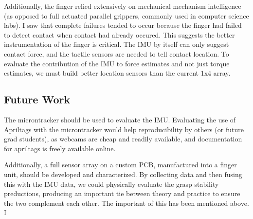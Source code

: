 \documentclass[12pt]{article}
\begin{document}
Additionally, the finger relied extensively on mechanical mechanism intelligence (as opposed to full
actuated parallel grippers, commonly used in computer science labs).  I saw that complete failures
tended to occur because the finger had failed to detect contact when contact had already occured.
This suggests the better instrumentation of the finger is critical. The IMU by itself can only
suggest contact force, and the tactile sensors are needed to tell contact location. To evaluate the
contribution of the IMU to force estimates and not just torque estimates, we must build better
location sensors than the current 1x4 array.


%
%

\subsection{Future Work}

The microntracker should be used to evaluate the IMU. Evaluating the use of Apriltags with the
microntracker would help reproducibility by others (or future grad students), as webcams are cheap
and readily available, and documentation for apriltags is freely available online.

Additionally, a full sensor array on a custom PCB, manufactured into a finger unit, should be
developed and characterized. By collecting data and then fusing this with the IMU data, we could
physically evaluate the grasp stability preductions, producing an important tie between theory and
practice to ensure the two complement each other. The important of this has been mentioned above.
I 
\end{document}

